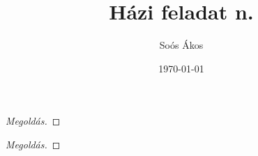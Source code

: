 \documentclass{homework}
\author{Soós Ákos}
\date{\today}
\title{Házi feladat n.}
\begin{document}
 
\maketitle
{}
\hfill \break

\begin{problem}
    \begin{proof}[Megoldás]
      
    \end{proof}
\end{problem}

\hfill \break

\begin{problem}
    \begin{proof}[Megoldás]
      
    \end{proof}
\end{problem}
\end{document}
